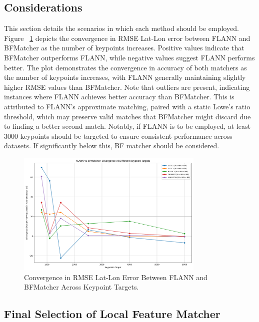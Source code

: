 \subsection{Considerations}
\label{sec:FLANN_BF_Considerations}
This section details the scenarios in which each method should be employed. Figure ~\ref{fig:FLANN BF Matcher Keypoint Convergence} depicts the convergence in RMSE Lat-Lon error between FLANN and BFMatcher as the number of keypoints increases. Positive values indicate that BFMatcher outperforms FLANN, while negative values suggest FLANN performs better. The plot demonstrates the convergence in accuracy of both matchers as the number of keypoints increases, with FLANN generally maintaining slightly higher RMSE values than BFMatcher. Note that outliers are present, indicating instances where FLANN achieves better accuracy than BFMatcher. This is attributed to FLANN's approximate matching, paired with a static Lowe's ratio threshold, which may preserve valid matches that BFMatcher might discard due to finding a better second match. Notably, if FLANN is to be employed, at least 3000 keypoints should be targeted to ensure consistent performance across datasets. If significantly below this, BF matcher should be considered. 

\begin{figure}[H]
    \centering
    \includegraphics[width=0.8\textwidth]{./Graphs/Divergence_BF_FLANN_KPS.png}
    \caption{Convergence in RMSE Lat-Lon Error Between FLANN and BFMatcher Across Keypoint Targets.}
    \label{fig:FLANN BF Matcher Keypoint Convergence} 
\end{figure}


\subsection{Final Selection of Local Feature Matcher}

